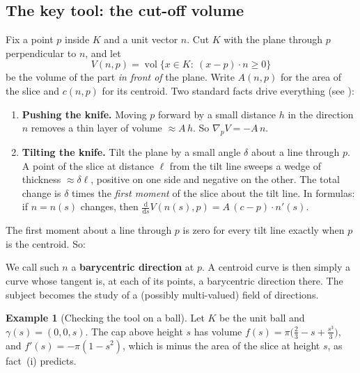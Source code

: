 \documentclass[11pt]{article}
\theoremstyle{plain}
\theoremstyle{definition}
\newtheorem{example}[lemma]{Example}
\theoremstyle{remark}
\newcommand{\vol}{\operatorname{vol}}
\begin{document}
\subsection{The key tool: the cut-off volume}
Fix a point $p$ inside $K$ and a unit vector $n$. Cut $K$ with the plane through $p$ perpendicular to $n$, and let
\[
  V(n,p)=\vol\{x\in K:\ (x-p)\cdot n\ge0\}
\]
be the volume of the part \emph{in front of} the plane. Write $A(n,p)$ for the area of the slice and $c(n,p)$ for its centroid. Two standard facts drive everything (see \cite[\S3]{schmid}):
\begin{enumerate}[label=(\roman*)]
\item \textbf{Pushing the knife.} Moving $p$ forward by a small distance $h$ in the direction $n$ removes a thin layer of volume $\approx A\,h$. So $\nabla_pV=-A\,n$.
\item \textbf{Tilting the knife.} Tilt the plane by a small angle $\delta$ about a line through $p$. A point of the slice at distance $\ell$ from the tilt line sweeps a wedge of thickness $\approx\delta\ell$, positive on one side and negative on the other. The total change is $\delta$ times the \emph{first moment} of the slice about the tilt line. In formulas: if $n=n(s)$ changes, then $\frac{\mathrm d}{\mathrm ds}V(n(s),p)=A\,(c-p)\cdot n'(s)$.
\end{enumerate}
The first moment about a line through $p$ is zero for every tilt line exactly when $p$ is the centroid. So:

\begin{center}
\end{center}

We call such $n$ a \textbf{barycentric direction} at $p$. A centroid curve is then simply a curve whose tangent is, at each of its points, a barycentric direction there. The subject becomes the study of a (possibly multi-valued) field of directions.

\begin{example}[Checking the tool on a ball]
Let $K$ be the unit ball and $\gamma(s)=(0,0,s)$. The cap above height $s$ has volume $f(s)=\pi\bigl(\tfrac23-s+\tfrac{s^3}{3}\bigr)$, and $f'(s)=-\pi(1-s^2)$, which is minus the area of the slice at height $s$, as fact~(i) predicts.
\end{example}
\end{document}
